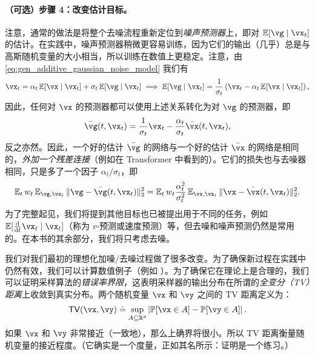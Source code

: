 \documentclass[../../book-main_zh.tex]{subfiles}
\begin{document}
\paragraph{（可选）步骤 4：改变估计目标。} 注意，通常的做法是将整个去噪流程重新定位到\textit{噪声预测器}上，即对 \(\Ex[\vg \mid \vx_{t}]\) 的估计。在实践中，噪声预测器稍微更容易训练，因为它们的输出（几乎）总是与高斯随机变量的大小相当，所以训练在数值上更稳定。注意，由 \eqref{eq:gen_additive_gaussian_noise_model} 我们有
\begin{equation}
	\vx_{t} = \alpha_{t}\Ex[\vx \mid \vx_{t}] + \sigma_{t}\Ex[\vg \mid \vx_{t}] \implies \Ex[\vg \mid \vx_{t}] = \frac{1}{\sigma_{t}}\bp{\vx_{t} - \alpha_{t}\Ex[\vx \mid \vx_{t}]},
\end{equation}
因此，任何对 \(\vx\) 的预测器都可以使用上述关系转化为对 \(\vg\) 的预测器，即
\begin{equation}
	\bar{\vg}(t, \vx_{t}) = \frac{1}{\sigma_{t}}\vx_{t} - \frac{\alpha_{t}}{\sigma_{t}}\bar{\vx}(t, \vx_{t}),
\end{equation}
反之亦然。因此，一个好的估计 \(\bar{\vg}\) 的网络与一个好的估计 \(\bar{\vx}\) 的网络是相同的，\textit{外加一个残差连接}（例如在 Transformer 中看到的）。它们的损失也与去噪器相同，只是多了一个因子 \(\alpha_{t}/\sigma_{t}\)，即
\begin{equation}
	\Ex_{t}w_{t}\Ex_{\vg, \vx_{t}}\norm{\vg - \bar{\vg}(t, \vx_{t})}_{2}^{2} = \Ex_{t}w_{t}\frac{\alpha_{t}^{2}}{\sigma_{t}^{2}}\Ex_{\vx, \vx_{t}}\norm{\vx - \bar{\vx}(t, \vx_{t})}_{2}^{2}.
\end{equation}
为了完整起见，我们将提到其他目标也已被提出用于不同的任务，例如 \(\Ex[\odv*{\vx_{t}}{t} \mid \vx_{t}]\)（称为 \(v\)-预测或速度预测）等，但去噪和噪声预测仍然是常用的。在本书的其余部分，我们将只考虑去噪。


我们对我们最初的理想化加噪/去噪过程做了很多改变。为了确保新过程在实践中仍然有效，我们可以计算数值例子（例如 ）。为了确保它在理论上是合理的，我们可以证明采样算法的\textit{错误率界限}，这表明采样器的输出分布在所谓的\textit{全变分（TV）距离}上收敛到真实分布。两个随机变量 \(\vx\) 和 \(\vy\) 之间的 TV 距离定义为：
\begin{equation}
	\TV(\vx, \vy) \doteq \sup_{A \subseteq \R^{d}}\abs*{\Pr[\vx \in A] - \Pr[\vy \in A]}.
\end{equation}
如果 \(\vx\) 和 \(\vy\) 非常接近（一致地），那么上确界将很小。所以 TV 距离衡量随机变量的接近程度。（它确实是一个度量，正如其名所示：证明是一个练习。）
\end{document}
